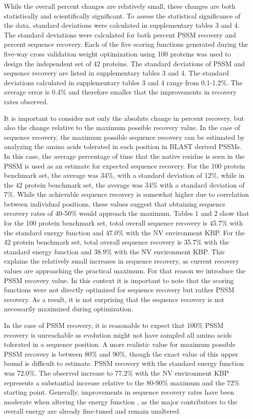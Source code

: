 While the overall percent changes are relatively small, these changes are both statistically and scientifically significant.
To assess the statistical significance of the data, standard deviations were calculated in supplementary tables 3 and 4.
The standard deviations were calculated for both percent PSSM recovery and percent sequence recovery.
Each of the five scoring functions generated during the five-way cross validation weight optimization using 100 proteins was used to design the independent set of 42 proteins.
The standard deviations of PSSM and sequence recovery are listed in supplementary tables 3 and 4.
The standard deviations calculated in supplementary tables 3 and 4 range from 0.1-1.2\%. 
The average error is 0.4\% and therefore smaller that the improvements in recovery rates observed. 

It is important to consider not only the absolute change in percent recovery, but also the change relative to the maximum possible recovery value.
In the case of sequence recovery, the maximum possible sequence recovery can be estimated by analyzing the amino acids tolerated in each position in BLAST derived PSSMs.
In this case, the average percentage of time that the native residue is seen in the PSSM is used as an estimate for expected sequence recovery.
For the 100 protein benchmark set, the average was 34\%, with a standard deviation of 12\%, while in the 42 protein benchmark set, the average was 34\% with a standard deviation of 7\%.
While the achievable sequence recovery is somewhat higher due to correlation between individual positions, these values suggest that obtaining sequence recovery rates of 40-50\% would approach the maximum.
Tables 1 and 2 show that for the 100 protein benchmark set, total overall sequence recovery is 45.7\% with the standard energy function and 47.0\% with the NV environment KBP.
For the 42 protein benchmark set, total overall sequence recovery is 35.7\% with the standard energy function and 38.9\% with the NV environment KBP.
This explains the relatively small increases in sequence recovery, as current recovery values are approaching the practical maximum.
For that reason we introduce the PSSM recovery value.
In this context it is important to note that the scoring functions were not directly optimized for sequence recovery but rather PSSM recovery.
As a result, it is not surprising that the sequence recovery is not necessarily maximized during optimization. 

In the case of PSSM recovery, it is reasonable to expect that 100\% PSSM recovery is unreachable as evolution might not have sampled all amino acids tolerated in a sequence position.
A more realistic value for maximum possible PSSM recovery is between 80\% and 90\%, though the exact value of this upper bound is difficult to estimate. PSSM recovery with the standard energy function was 72.0\%.
The observed increase to 77.2\% with the NV environment KBP represents a substantial increase relative to the 80-90\% maximum and the 72\% starting point.
Generally, improvements in sequence recovery rates have been moderate when altering the energy function \citep{Kortemme:2003td}, as the major contributors to the overall energy are already fine-tuned and remain unaltered. 

